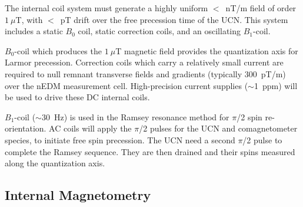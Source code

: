 The internal coil system must generate a highly uniform $<$~nT/m field of order $1~\mu$T, with $<$~pT drift over the free precession time of the UCN. This system includes a static $B_0$ coil, static correction coils, and an oscillating $B_1$-coil.




$B_0$-coil which produces the $1~\mu$T magnetic field provides the quantization axis for Larmor precession. Correction coils which carry a relatively small current are required to null remnant transverse fields and gradients (typically $300$~pT/m) over the nEDM measurement cell. High-precision current supplies ($\sim$1~ppm) will be used to drive these DC internal coils. 






$B_1$-coil ($\sim$30~Hz) is used in the Ramsey resonance method for $\pi$/2 spin re-orientation. AC coils will apply the $\pi$/2 pulses for the UCN and comagnetometer species, to initiate free spin precession. The UCN need a second $\pi$/2 pulse to complete the Ramsey sequence. They are then drained and their spins measured along the quantization axis.

\subsection{Internal Magnetometry}

